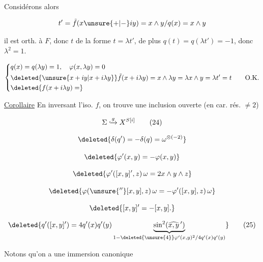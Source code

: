 

Considérons alors

\[
t'=\tilde f(x\unsure{+|-}iy)=x\wedge y/q(x)=x\wedge y
\]

il est orth. à $F$,  donc $t$ de la forme $t=\lambda t'$, de plus $q(t)=q(\lambda t')=-1$, donc $\lambda^2=1$. 


\[
\left\{\begin{aligned} &q(x)=q(\lambda y)=1,\quad\varphi(x,\lambda y)=0\\ &\deleted{\unsure{x+iy|x+i\lambda y}}\tilde f(x+i\lambda y)=x\wedge\lambda y=\lambda x\wedge y=\lambda t'=t \qquad\text{O.K.}\\ &\deleted{f(x+i\lambda y)=}\end{aligned}\right.
\]

\uline{Corollaire} En inversant l'iso. $f$, on trouve une inclusion ouverte (en car. rés. $\ne 2$)

\[
\Sigma\lhook\joinrel\xrightarrow{g}X^{S[i]}\tag*{(24)}
\]


\[
\deleted{\delta(q')=-\delta(q)=\omega^{\otimes(-2)}}
\]


\[
\deleted{\varphi'(x,y)=-\varphi(x,y)}
\]


\[
\deleted{\varphi'([x,y]',z)\,\omega=2x\wedge y\wedge z}
\]


\[
\deleted{\varphi(\unsure{{}^{\prime\prime}}[x,y],z)\,\omega=-\varphi'([x,y],z)\,\omega}
\]

\[
\deleted{[x,y]'=-[x,y].}
\]


\[
\deleted{q'([x,y]')=4q'(x)q'(y)\underbrace{\sin^2(\widehat{x,y}\,')}_{1-\deleted{\unsure{4}}\varphi'(x,y)^2/4q'(x)q'(y)}}\tag*{(25)}
\]


Notons qu'on a une immersion canonique

